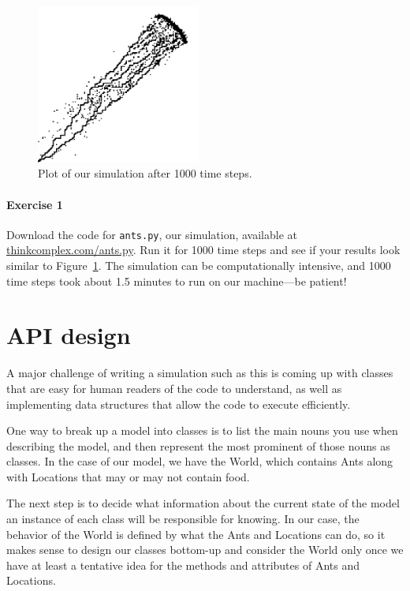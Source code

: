 \begin{figure}[h]
  \begin{center}
    \includegraphics[width=0.48\textwidth]{figs/plot.png}
  \end{center}
  \caption{Plot of our simulation after 1000 time steps.}
  \label{fig:plot}
\end{figure}

\paragraph{Exercise 1}

Download the code for \texttt{ants.py}, our simulation, available at \url{thinkcomplex.com/ants.py}.  Run it for 1000 time steps and see if your results look similar to Figure~\ref{fig:plot}. The simulation can be computationally intensive, and 1000 time steps took about 1.5 minutes to run on our machine---be patient!

\section{API design}

A major challenge of writing a simulation such as this is coming up with classes that are easy for human readers of the code to understand, as well as implementing data structures that allow the code to execute efficiently.

One way to break up a model into classes is to list the main nouns you use when describing the model, and then represent the most prominent of those nouns as classes. In the case of our model, we have the World, which contains Ants along with Locations that may or may not contain food.

The next step is to decide what information about the current state of the model an instance of each class will be responsible for knowing. In our case, the behavior of the World is defined by what the Ants and Locations can do, so it makes sense to design our classes bottom-up and consider the World only once we have at least a tentative idea for the methods and attributes of Ants and Locations.

